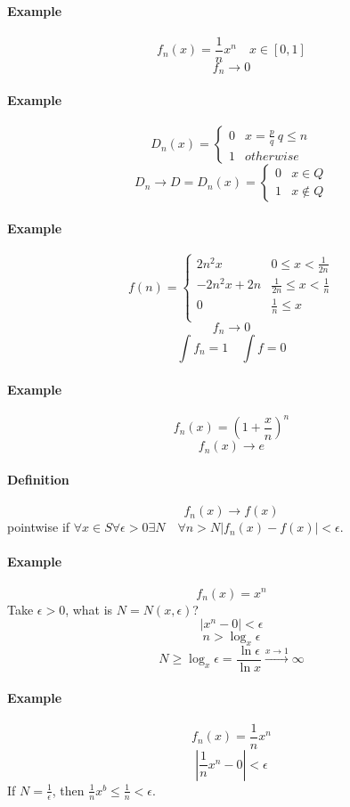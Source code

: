 \paragraph{Example}
$$f_n(x) = \frac{1}{n}x^n\quad x\in[0,1]$$
$$f_n \to 0$$
\paragraph{Example}
$$D_n(x) = \begin{cases}
0 &x=\frac{p}{q} \: q \leq n\\
1 & otherwise
\end{cases}$$
$$D_n \to D = D_n(x) = \begin{cases}
	0 &x\in Q\\
	1 & x \not\in Q
\end{cases}$$
\paragraph{Example}
$$f(n) = \begin{cases}
2n^2x& 0\leq x < \frac{1}{2n}\\
-2n^2x+2n& \frac{1}{2n}\leq x < \frac{1}{n}\\
0 & \frac{1}{n} \leq x \\
\end{cases}$$
$$f_n \to 0$$
$$\int f_n = 1 \quad \int f = 0$$
\paragraph{Example}
$$f_n(x) = \left(1+\frac{x}{n}\right)^n$$
$$f_n(x) \to e$$
\paragraph{Definition}
$$f_n(x) \to f(x)$$ pointwise if $\forall x\in S \forall \epsilon>0  \exists N \quad \forall n > N \left| f_n(x) -f(x) \right| < \epsilon$.
\paragraph{Example}
$$f_n(x) = x^n$$
Take $\epsilon>0$, what is $N=N(x,\epsilon)$? 
$$|x^n -0| < \epsilon$$
$$n > \log_x \epsilon$$
$$N \geq \log_x \epsilon = \frac{\ln \epsilon}{\ln x} \stackrel{x\to 1}{\to} \infty$$
\paragraph{Example}
$$f_n(x) = \frac{1}{n}x^n$$
$$|\frac{1}{n}x^n -0| < \epsilon$$
If $N =\frac{1}{\epsilon} $, then $\frac{1}{n}x^b \leq \frac{1}{n} < \epsilon$.
